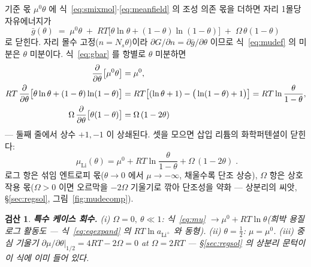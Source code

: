 \documentclass[11pt,a4paper]{article}
\newtheorem*{verifybox}{검산}
\begin{document}
기준 몫 $\mu^0\theta$ 에 식~\eqref{eq:smixmol}$\cdot$\eqref{eq:meanfield} 의 조성 의존 몫을 더하면 자리 1몰당 자유에너지가
\begin{equation}
\bar g(\theta)\;=\;\mu^0\theta\;+\;RT\big[\theta\ln\theta+(1-\theta)\ln(1-\theta)\big]
\;+\;\Omega\,\theta(1-\theta)
\label{eq:gbar}
\end{equation}
로 닫힌다. 자리 몰수 고정($n=N_s\theta$)이라 $\partial G/\partial n=\partial\bar g/\partial\theta$ 이므로 식~\eqref{eq:mudef} 의 미분은 $\theta$ 미분이다. 식~\eqref{eq:gbar} 를 항별로 $\theta$ 미분하면
\begin{align}
\frac{\partial}{\partial\theta}\big[\mu^0\theta\big]&=\mu^0,\notag\\
RT\,\frac{\partial}{\partial\theta}\big[\theta\ln\theta+(1-\theta)\ln(1-\theta)\big]
&=RT\big[(\ln\theta+1)-\big(\ln(1-\theta)+1\big)\big]=RT\ln\frac{\theta}{1-\theta},
\label{eq:mixderiv}\\
\Omega\,\frac{\partial}{\partial\theta}\big[\theta(1-\theta)\big]&=\Omega\,(1-2\theta)
\notag
\end{align}
— 둘째 줄에서 상수 $+1,-1$ 이 상쇄된다. 셋을 모으면 삽입 리튬의 화학퍼텐셜이 닫힌다:
\begin{equation}
\boxed{\;\mu_{\mathrm{Li}}(\theta)=\mu^0+RT\ln\frac{\theta}{1-\theta}+\Omega\,(1-2\theta)\;.}
\label{eq:mu}
\end{equation}
로그 항은 섞임 엔트로피 몫($\theta\to0$ 에서 $\mu\to-\infty$, 채울수록 단조 상승), $\Omega$ 항은 상호작용 몫($\Omega>0$ 이면 오르막을 $-2\Omega$ 기울기로 깎아 단조성을 약화 — 상분리의 씨앗, \S\ref{sec:regsol}, 그림~\ref{fig:mudecomp}).

\begin{verifybox}
\textbf{특수 케이스 회수.} (i) $\Omega=0,\ \theta\ll1$: 식~\eqref{eq:mu} $\to\mu^0+RT\ln\theta$(희박 용질 로그 활동도 — 식~\eqref{eq:eqexpand} 의 $RT\ln a_{\mathrm{Li^+}}$ 와 동형). (ii) $\theta=\tfrac12$: $\mu=\mu^0$. (iii) 중심 기울기 $\partial\mu/\partial\theta|_{1/2}=4RT-2\Omega=0$ at $\Omega=2RT$ — \S\ref{sec:regsol} 의 상분리 문턱이 이 식에 이미 들어 있다.
\end{verifybox}
\end{document}
